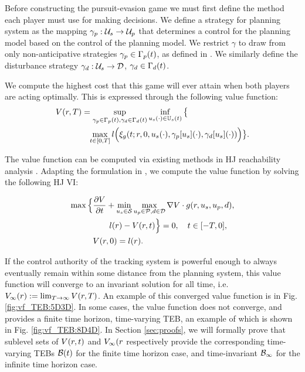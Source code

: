 Before constructing the pursuit-evasion game we must first define the method each player must use for making decisions. 
We define a strategy for planning system as the mapping $\gamma_{p} : \mathcal{U}_s \rightarrow \mathcal{U}_p$ that determines a control for the planning model based on the control of the planning model. We restrict $\gamma$ to draw from only non-anticipative strategies $\gamma_{p} \in \Gamma_p(t)$, as defined in \cite{Mitchell05}. 
We similarly define the disturbance strategy $\gamma_{d}: \mathcal{U}_s \rightarrow \mathcal{D}$, $\gamma_{d} \in \Gamma_d(t)$.

We compute the highest cost that this game will ever attain when both players are acting optimally. 
This is expressed through the following value function:
\begin{align}
&V(\rstate,\thor)= \sup_{\gamma_{\pstate} \in \Gamma_\pstate(t), \gamma_{\dstb} \in \Gamma_\dstb(t)} \inf_{\tctrl(\cdot) \in \tcfset(t)} \big\{ \nonumber \\
&\qquad\qquad \max_{\tvar\in [0, \thor]} \errfunc\Big(\rtraj(\tvar; \rstate, 0, \tctrl(\cdot), \gamma_\pstate[\tctrl](\cdot), \gamma_\dstb[\tctrl](\cdot))\Big)\big\}. \label{eq:valfunc}
\end{align} 

The value function can be computed via existing methods in HJ reachability analysis \cite{}.
Adapting the formulation in \cite{Fisac15}, we compute the value function by solving the following HJ VI:

\begin{align}
\max \Big\{&\frac{\partial \valfunc}{\partial \tvar} + \min_{\tctrl\in\tset} \max_{\pctrl\in\pset, \dstb\in\dset} \deriv \cdot \rdyn(\rstate, \tctrl, \pctrl, \dstb), \nonumber \\
&\qquad\errfunc(\rstate) - \valfunc(\rstate, \tvar)\Big\} = 0, \quad \tvar \in [-T, 0], \label{eq:HJVI} \\
&\valfunc(\rstate, 0) = \errfunc(\rstate). \nonumber
\end{align}

If the control authority of the tracking system is powerful enough to always eventually remain within some distance from the planning system, this value function will converge to an invariant solution for all time, i.e. $V_\infty(r) := \lim_{T\rightarrow\infty} V(r, T)$. 
An example of this converged value function is in Fig. \ref{fig:vf_TEB:5D3D}. 
In some cases, the value function does not converge, and provides a finite time horizon, time-varying TEB, an example of which is shown in Fig. \ref{fig:vf_TEB:8D4D}.
In Section \ref{sec:proofs}, we will formally prove that sublevel sets of $V(r,t)$ and $V_\infty(r$ respectively provide the corresponding time-varying TEBs $\mathcal B(t)$ for the finite time horizon case, and time-invariant $\mathcal B_\infty$ for the infinite time horizon case.
 

